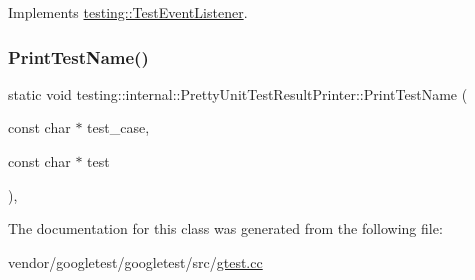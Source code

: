 Implements \hyperlink{classtesting_1_1_test_event_listener_ab4f6a0ca16ae75daf385b3b5914e1048}{testing\+::\+Test\+Event\+Listener}.

\mbox{\label{classtesting_1_1internal_1_1_pretty_unit_test_result_printer_a5b60a9aed1db02837b11450f6e8d0f71}} 
\subsubsection{\texorpdfstring{Print\+Test\+Name()}{PrintTestName()}}
{\footnotesize\ttfamily static void testing\+::internal\+::\+Pretty\+Unit\+Test\+Result\+Printer\+::\+Print\+Test\+Name (\begin{DoxyParamCaption}\item[{const char $\ast$}]{test\+\_\+case,  }\item[{const char $\ast$}]{test }\end{DoxyParamCaption})\hspace{0.3cm}{\ttfamily [inline]}, {\ttfamily [static]}}



The documentation for this class was generated from the following file\+:\begin{DoxyCompactItemize}
\item 
vendor/googletest/googletest/src/\hyperlink{gtest_8cc}{gtest.\+cc}\end{DoxyCompactItemize}
